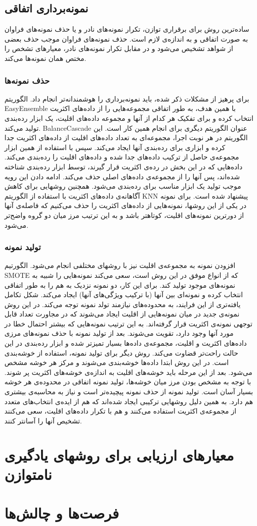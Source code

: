 \documentclass{article}
\begin{document}
\subsection{نمونه‌برداری اتفاقی}
ساده‌ترین روش برای برقراری توازن، تکرار نمونه‌های نادر و یا حذف نمونه‌های فراوان به صورت اتفاقی و به اندازه‌ی لازم است. حذف نمونه‌های فراوان موجب حذف بعضی از شواهد تشخیص می‌شود و در مقابل تکرار نمونه‌های نادر، معیارهای تشخص را مختص همان نمونه‌ها می‌کند.
\subsubsection{حذف نمونه‌ها}
برای پرهیز از مشکلات ذکر شده، باید نمونه‌برداری را هوشمندانه‌تر انجام داد. الگوریتم EasyEnsemble با همین هدف، به طور اتفاقی مجموعه‌هایی را از داده‌های اکثریت انتخاب کرده و برای تفکیک هر کدام از آنها و مجموعه داده‌های اقلیت، یک ابزار رده‌بندی تولید می‌کند. BalanceCascade عنوان الگوریتم دیگری برای انجام همین کار است. این الگوریتم در هر نوبت اجرا، مجموعه‌ای به تعداد داده‌های اقلیت از داده‌های اکثریت جدا کرده و ابزاری برای رده‌بندی آنها ایجاد می‌کند. سپس با استفاده از همین ابزار مجموعه‌ی حاصل از ترکیب داده‌های جدا شده و داده‌های اقلیت را رده‌بندی می‌کند. داده‌هایی که در این بخش در رده‌ی اکثریت قرار گیرند، توسط ابزار رده‌بندی شناخته شده‌اند، پس آنها را از مجموعه‌ی داده‌های اصلی حذف می‌کند. ادامه دادن این رویه موجب تولید یک ابزار مناسب برای رده‌بندی می‌شود.
همچنین روشهایی برای کاهش آگاهانه‌ی داده‌های اکثریت با استفاده از الگوریتم KNN پیشنهاد شده است. برای نمونه در یکی از این روشها، نمونه‌هایی از داده‌های اکثریت را حذف می‌کنیم که فاصله‌ی آنها از دورترین نمونه‌های اقلیت، کوتاهتر باشد و به این ترتیب مرز میان دو گروه واضح‌تر می‌شود.

\subsubsection{تولید نمونه}
افزودن نمونه به مجموعه‌ی اقلیت نیز با روشهای مختلفی انجام می‌شود. الگورتیم SMOTE که از انواع موفق در این روش است، سعی می‌کند نمونه‌هایی را شبیه به نمونه‌های موجود تولید کند. برای این کار، دو نمونه نزدیک به هم را به طور اتفاقی انتخاب کرده و نمونه‌ای بین آنها (با ترکیب ویژگی‌های آنها) ایجاد می‌کند.
شکل تکامل یافته‌تری از این فرایند، به محدوده‌های نیازمند تولد نمونه توجه می‌کند. در این روش نمونه‌ی جدید در میان نمونه‌هایی از اقلیت ایجاد می‌شوند که در مجاورت تعداد قابل توجهی نمونه‌ی اکثریت قرار گرفته‌اند. به این ترتیب نمونه‌هایی که بیشتر احتمال خطا در مورد آنها وجود دارد، تقویت می‌شوند. بعد از تولید نمونه با حذف نمونه‌های مرزی داده‌های اکثریت و اقلیت، مجموعه‌ی داده‌ها بسیار تمیزتر شده و ابزار رده‌بندی در این حالت راحت‌تر قضاوت می‌کند.
روش دیگر برای تولید نمونه، استفاده از خوشه‌بندی است. در این روش ابتدا داده‌ها خوشه‌بندی می‌شوند و مرکز هر خوشه مشخص می‌شود. بعد از این مرحله باید خوشه‌های اقلیت به اندازه‌ی خوشه‌های اکثریت پر شوند. با توجه به مشخص بودن مرز میان خوشه‌ها، تولید نمونه اتفاقی در محدوده‌ی هر خوشه بسیار آسان است.
تولید نمونه از حذف نمونه پیچیده‌تر است و نیاز به محاسبه‌ی بیشتری هم دارد. به همین دلیل روشهایی ترکیبی ایجاد شده‌اند که هم از ایده‌ی انتخاب‌های متعدد از مجموعه‌ی اکثریت استفاده می‌کنند و هم با تکرار داده‌های اقلیت، سعی می‌کنند تشخیص آنها را آسانتر کنند.

\section{معیارهای ارزیابی برای روشهای یادگیری نامتوازن}

\section{فرصت‌ها و چالش‌ها}
\end{document}
